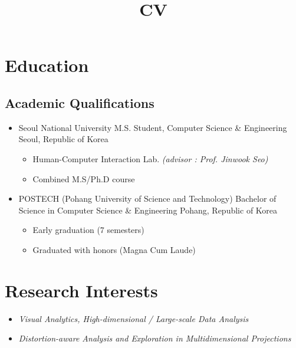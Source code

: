 \documentclass[11pt,a4paper,sans]{moderncv}
\title{CV}
\newcommand{\postech}{POSTECH (Pohang University of Science and Technology)}
\newcommand{\snu}{Seoul National University}
\newcommand{\pohang}{Pohang, Republic of Korea}
\newcommand{\seoul}{Seoul, Republic of Korea}
\newcommand{\changeurlcolor}[1]{\hypersetup{urlcolor=#1}}
\begin{document}
\changeurlcolor{blue}
\makecvtitle

\section{Education}
\vspace{5pt}
\subsection{Academic Qualifications}

\vspace{5pt}

\begin{itemize}

\item{
              {\snu}
              {M.S. Student, Computer Science \& Engineering}
              {\seoul}
              {}
              {
                \begin{itemize}
                    \item Human-Computer Interaction Lab. \textit{(advisor : Prof. Jinwook Seo)} 
                    \item Combined M.S/Ph.D course
                \end{itemize}
              }}
\vspace{4mm}

\item{
              {\postech}
              {Bachelor of Science in Computer Science \& Engineering}
              {\pohang}
              {}
              {
                \begin{itemize}
                    \item Early graduation (7 semesters)
                    \item Graduated with honors (Magna Cum Laude)
                \end{itemize}
              }}


\vspace{4mm}

\end{itemize}


\section{Research Interests}
\begin{itemize}

    \item \textit{Visual Analytics, High-dimensional / Large-scale Data Analysis}
    \item \textit{Distortion-aware Analysis and Exploration in Multidimensional Projections}\vspace{1mm}
    
\end{itemize}
\end{document}
